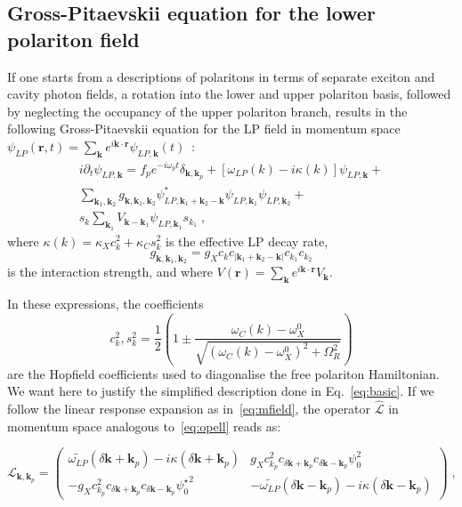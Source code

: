\begin{subappendices}
\section{Gross-Pitaevskii equation for the lower polariton field}
\label{app:full}
%
If one starts from a descriptions of polaritons in terms of separate
exciton and cavity photon fields, a rotation into the lower and upper
polariton basis, followed by neglecting the occupancy of the upper
polariton branch, results in the following Gross-Pitaevskii equation
for the LP field in momentum space
$\psi_{LP}(\bm{r},t) = \sum_{\bm{k}} e^{i\bm{k}\cdot \bm{r}}
\psi_{LP,\bm{k}} (t)$~\cite{Ciuti_2003}:
%
\begin{multline}
  i\partial_t \psi_{LP,\bm{k}} = f_p e^{-i\omega_p t}
  \delta_{\bm{k},\bm{k}_p} + \left[\omega_{LP} (k) - i\kappa
    (k)\right]\psi_{LP,\bm{k}} +\\
%
  \sum_{\bm{k}_1, \bm{k}_2} g_{\bm{k}, \bm{k}_1, \bm{k}_2}
  \psi^*_{LP,\bm{k}_1 + \bm{k}_2-\bm{k}} \psi_{LP,\bm{k}_1}
  \psi_{LP,\bm{k}_2} +\\ s_k \sum_{\bm{k}_1} V_{\bm{k} -
    \bm{k}_1} \psi_{LP,\bm{k}_1} s_{k_1}\; ,
\end{multline}
%
where $\kappa(k)=\kappa_X c^2_k + \kappa_C s^2_k$ is the effective LP
decay rate,
%
\begin{equation}
  g_{\bm{k}, \bm{k}_1, \bm{k}_2}=g_X c_{k}c_{|\bm{k}_1 + \bm{k}_2-\bm{k}|} c_{k_1} c_{k_2}
\end{equation}
%
is the interaction strength, and where
$V(\bm{r}) = \sum_{\bm{k}} e^{i\bm{k}\cdot \bm{r}} V_{\bm{k}}$.

In these expressions, the coefficients
%
\begin{equation}
  c^2_{k}, s^2_{k} = \frac{1}{2} \left(1 \pm \frac{\omega_C(k) -
    \omega_X^0}{\sqrt{(\omega_C(k) - \omega_X^0)^2 +
      \Omega_R^2}}\right)
\end{equation}
%
are the Hopfield coefficients used to diagonalise the free polariton
Hamiltonian. We want here to justify the simplified description done
in Eq.~\eqref{eq:basic}. If we follow the linear response expansion as
in~\eqref{eq:mfield}, the operator $\hat{\mathcal{L}}$ in momentum
space analogous to~\eqref{eq:opell} reads as:

%
\begin{equation}
  \mathcal{L}_{\bm{k},\bm{k}_p} = \begin{pmatrix}
    \widetilde{\omega_{LP}} (\delta \bm{k}+\bm{k}_p) - i
    \kappa(\delta \bm{k}+\bm{k}_p) & g_X c_{k_p}^2 c_{\delta
      \bm{k}+\bm{k}_p} c_{\delta \bm{k}-\bm{k}_p} \psi_0^2
    \\ - g_X c_{k_p}^2 c_{\delta \bm{k}+\bm{k}_p} c_{\delta
      \bm{k}-\bm{k}_p}{\psi_0^{\star}}^2 & -
    \widetilde{\omega_{LP}}(\delta \bm{k}-\bm{k}_p) -
    i\kappa(\delta \bm{k}-\bm{k}_p) \end{pmatrix}\; ,
\label{eq:opel2}
\end{equation}
%


\end{subappendices}
